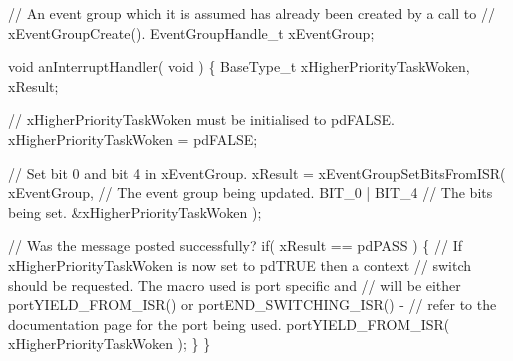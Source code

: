 \begin{DoxyPre}  // An event group which it is assumed has already been created by a call to
  // xEventGroupCreate().
  EventGroupHandle\_t xEventGroup;\end{DoxyPre}



\begin{DoxyPre}  void anInterruptHandler( void )
  \{
  BaseType\_t xHigherPriorityTaskWoken, xResult;\end{DoxyPre}



\begin{DoxyPre}    // xHigherPriorityTaskWoken must be initialised to pdFALSE.
    xHigherPriorityTaskWoken = pdFALSE;\end{DoxyPre}



\begin{DoxyPre}    // Set bit 0 and bit 4 in xEventGroup.
    xResult = xEventGroupSetBitsFromISR(
                        xEventGroup,    // The event group being updated.
                        BIT\_0 | BIT\_4   // The bits being set.
                        \&xHigherPriorityTaskWoken );\end{DoxyPre}



\begin{DoxyPre}    // Was the message posted successfully?
    if( xResult == pdPASS )
    \{
        // If xHigherPriorityTaskWoken is now set to pdTRUE then a context
        // switch should be requested.  The macro used is port specific and
        // will be either portYIELD\_FROM\_ISR() or portEND\_SWITCHING\_ISR() -
        // refer to the documentation page for the port being used.
        portYIELD\_FROM\_ISR( xHigherPriorityTaskWoken );
    \}
 \}
  \end{DoxyPre}
 